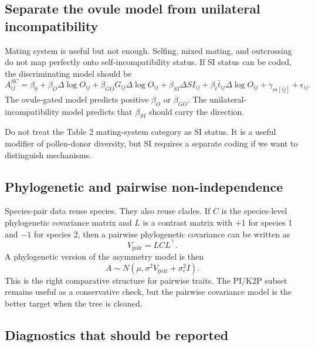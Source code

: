 \documentclass[12pt]{article}
\begin{document}
\subsection{Separate the ovule model from unilateral incompatibility}

Mating system is useful but not enough. Selfing, mixed mating, and outcrossing do not map perfectly onto self-incompatibility status. If SI status can be coded, the discriminating model should be
\begin{equation}
A^{SC}_{ij}=\beta_0+\beta_O\Delta\log O_{ij}
+\beta_{GO}G_{ij}\Delta\log O_{ij}
+\beta_{SI}\Delta SI_{ij}
+\beta_t\bar{t}_{ij}\Delta\log O_{ij}
+\gamma_{m[ij]}+\epsilon_{ij}.
\label{eq:SI-discriminating-analysis}
\end{equation}
The ovule-gated model predicts positive $\beta_O$ or $\beta_{GO}$. The unilateral-incompatibility model predicts that $\beta_{SI}$ should carry the direction.

\begin{cautionbox}
Do not treat the Table 2 mating-system category as SI status. It is a useful modifier of pollen-donor diversity, but SI requires a separate coding if we want to distinguish mechanisms.
\end{cautionbox}

\subsection{Phylogenetic and pairwise non-independence}

Species-pair data reuse species. They also reuse clades. If $C$ is the species-level phylogenetic covariance matrix and $L$ is a contrast matrix with $+1$ for species 1 and $-1$ for species 2, then a pairwise phylogenetic covariance can be written as
\begin{equation}
V_{\mathrm{pair}}=LCL^{\top}.
\label{eq:pairwise-phylo-covariance}
\end{equation}
A phylogenetic version of the asymmetry model is then
\begin{equation}
A\sim N(\mu,\sigma^2V_{\mathrm{pair}}+\sigma_e^2I).
\label{eq:phylo-analysis}
\end{equation}
This is the right comparative structure for pairwise traits. The PI/K2P subset remains useful as a conservative check, but the pairwise covariance model is the better target when the tree is cleaned.

\subsection{Diagnostics that should be reported}
\end{document}
